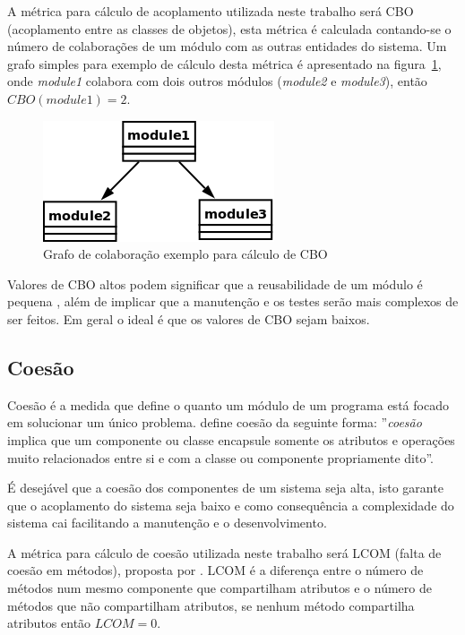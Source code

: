 A métrica para cálculo de acoplamento utilizada neste trabalho será CBO
(acoplamento entre as classes de objetos), esta métrica é calculada contando-se
o número de colaborações de um módulo com as outras entidades do sistema.  Um
grafo simples para exemplo de cálculo desta métrica é apresentado na
figura~\ref{fig:exemplo-cbo}, onde {\it module1} colabora com dois outros
módulos ({\it module2} e {\it module3}), então $CBO(module1) = 2$.

\begin{figure}[h]
\center
\includegraphics[scale=0.4]{imagens/exemplo-cbo}
\caption{Grafo de colaboração exemplo para cálculo de CBO}
\label{fig:exemplo-cbo}
\end{figure}

Valores de CBO altos podem significar que a reusabilidade de um módulo é
pequena \cite{engenhariaDeSoftwarePressman}, além de implicar que a manutenção
e os testes serão mais complexos de ser feitos. Em geral o ideal é que os
valores de CBO sejam baixos.

\subsection{Coesão}

Coesão é a medida que define o quanto um módulo de um programa está focado em
solucionar um único problema.  define
coesão da seguinte forma: ''{\it coesão} implica que um componente ou classe
encapsule somente os atributos e operações muito relacionados entre si e com a
classe ou componente propriamente dito''.

É desejável que a coesão dos componentes de um sistema seja alta, isto garante
que o acoplamento do sistema seja baixo e como consequência a complexidade do
sistema cai facilitando a manutenção e o desenvolvimento. 

A métrica para cálculo de coesão utilizada neste trabalho será LCOM (falta de
coesão em métodos), proposta por . LCOM é a
diferença entre o número de métodos num mesmo componente que compartilham
atributos e o número de métodos que não compartilham atributos, se nenhum
método compartilha atributos então $LCOM = 0$.


